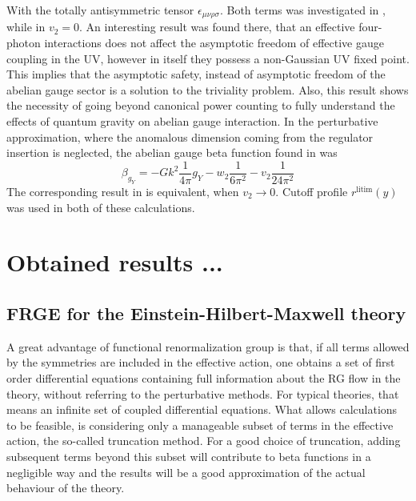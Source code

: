\documentclass[11pt, a4paper]{article}
\begin{document}
With the totally antisymmetric tensor $\epsilon_{\mu\nu\rho\sigma}$.
Both terms was investigated in \cite{kwapisz_eichhorn}, while in \cite{christiansen_eichhorn} $v_2 = 0$.
An interesting result was found there, that an effective four-photon interactions does not affect the asymptotic freedom of effective gauge coupling
in the UV, however in itself they possess a non-Gaussian UV fixed point. This implies that the asymptotic safety, instead of asymptotic freedom
of the abelian gauge sector is a solution to the triviality problem. Also, this result shows
the necessity of going beyond canonical power counting to fully understand the effects of quantum gravity on abelian gauge interaction.
In the perturbative approximation, where the anomalous dimension coming from the regulator insertion is neglected,
the abelian gauge beta function found in \cite{kwapisz_eichhorn} was
\begin{equation}
    \beta_{g_Y} = - Gk^2 \frac{1}{4\pi} g_Y - w_2 \frac{1}{6\pi^2} - v_2 \frac{1}{24\pi^2}
\end{equation}
The corresponding result in \cite{christiansen_eichhorn} is equivalent, when $v_2 \rightarrow 0$.
Cutoff profile $r^{\text{litim}}(y)$ was used in both of these calculations.

\section{Obtained results ...}

\subsection{FRGE for the Einstein-Hilbert-Maxwell theory}

A great advantage of functional renormalization group is that, if all terms
allowed by the symmetries are included in the effective action, one obtains a set of first order
differential equations containing full information about the RG flow in the theory, without referring to the perturbative methods.
For typical theories, that means an infinite set of coupled differential equations.
What allows calculations to be feasible, is considering only a manageable subset of terms in the effective action, the so-called truncation method.
For a good choice of truncation, adding subsequent terms beyond this subset will contribute to beta functions in a negligible way
and the results will be a good approximation of the actual behaviour of the theory.
\end{document}
